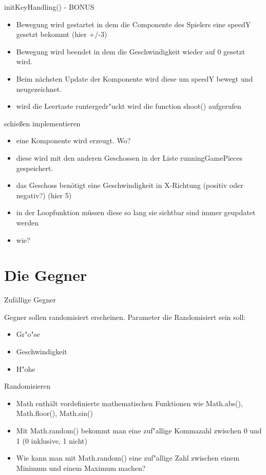 \documentclass[18pt]{beamer}
\begin{document}
\begin{frame}{initKeyHandling() - BONUS}
\begin{itemize}
	\item Bewegung wird gestartet in dem die Componente des Spielers eine speedY gesetzt bekommt (hier +/-3)
	\item Bewegung wird beendet in dem die Geschwindigkeit wieder auf 0 gesetzt wird.
	\item Beim nächsten Update der Komponente wird diese um speedY bewegt und neugezeichnet.
	\item wird die Leertaste runtergedr"uckt wird die function shoot() aufgerufen
\end{itemize}
\end{frame}

\begin{frame}{schießen implementieren}
\begin{itemize}
	\item eine Komponente wird erzeugt. Wo? 
	\item diese wird mit den anderen Geschossen in der Liste runningGamePieces gespeichert. 
	\item das Geschoss benötigt eine Geschwindigkeit in X-Richtung (positiv oder negativ?) (hier 5)
	\item in der Loopfunktion müssen diese so lang sie sichtbar sind immer geupdatet werden
	\item wie?
\end{itemize}
\end{frame}

\section{Die Gegner}
\begin{frame}{Zufällige Gegner}

Gegner sollen randomisiert erscheinen.
Parameter die Randomisiert sein soll:
\begin{itemize}
	\item Gr"o"se
	\item Geschwindigkeit
	\item H"ohe
\end{itemize}
\end{frame}

\begin{frame}{Randomisieren}
\begin{itemize}
	\item Math enthält vordefinierte mathematischen Funktionen wie Math.abs(), Math.floor(), Math.sin()
	\item Mit Math.random() bekommt man eine zuf"allige Kommazahl zwischen 0 und 1 (0 inklusive, 1 nicht)
	\item Wie kann man mit Math.random() eine zuf"allige Zahl zwischen einem Minimum und einem Maximum machen?
	
\end{itemize}
\end{frame}
\end{document}
